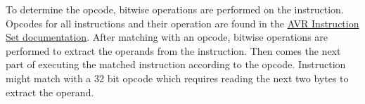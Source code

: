 To determine the opcode, bitwise operations are performed on the instruction. Opcodes for all instructions and their operation are found in the \href{http://www.atmel.com/images/doc0856.pdf}{AVR Instruction Set documentation}. After matching with an opcode, bitwise operations are performed to extract the operands from the instruction. Then comes the next part of executing the matched instruction according to the opcode.
\noindent Instruction might match with a 32 bit opcode which requires reading the next two bytes to extract the operand.




